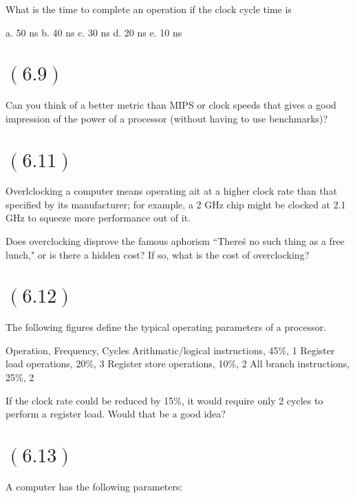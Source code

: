 \documentclass[letterpaper,12pt,titlepage]{article}
\begin{document}
What is the time to complete an operation if the clock cycle time is

a. 50 ns
b. 40 ns
c. 30 ns
d. 20 ns
e. 10 ns

\begin{mdframed}[style=MyFrame]
\end{mdframed}

\section*{$(6.9)$} Can you think of a better metric than MIPS or clock speeds that gives a good impression of the power of a processor (without having to use benchmarks)?

\begin{mdframed}[style=MyFrame]
\end{mdframed}

\section*{$(6.11)$} Overlclocking a computer means operating ait at a higher clock rate than that specified by its manufacturer; for example, a 2 GHz chip might be clocked at 2.1 GHz to squeeze more performance out of it.

Does overclocking disprove the famous aphorism ``There\'s no such thing as a free lunch," or is there a hidden cost? If so, what is the cost of overclocking?

\begin{mdframed}[style=MyFrame]
\end{mdframed}

\section*{$(6.12)$} The following figures define the typical operating parameters of a processor.

Operation, Frequency, Cycles
Arithmatic/logical instructions, 45\%, 1
Register load operations, 20\%, 3
Register store operations, 10\%, 2
All branch instructions, 25\%, 2

If the clock rate could be reduced by 15\%, it would require only 2 cycles to perform a register load. Would that be a good idea?

\begin{mdframed}[style=MyFrame]
\end{mdframed}

\section*{$(6.13)$} A computer has the following parameters:
\end{document}

